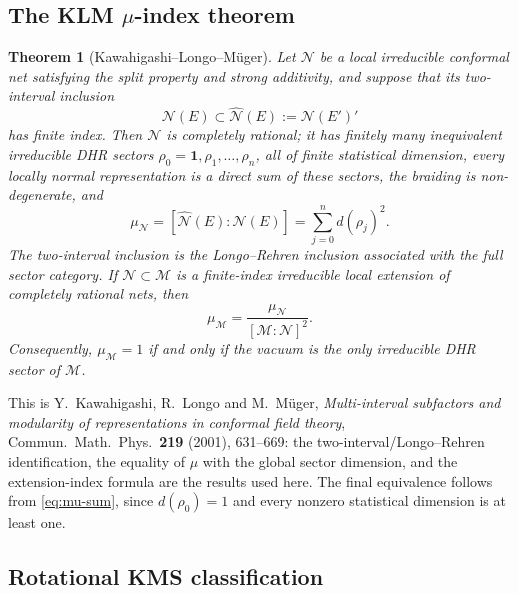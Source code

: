\documentclass[11pt]{article}
\newtheorem{theorem}{Theorem}[section]
\theoremstyle{remark}
\newcommand{\id}{\mathbf 1}
\begin{document}
\subsection{\texorpdfstring{The KLM $\mu$-index theorem}{The KLM mu-index theorem}}

\begin{theorem}[Kawahigashi--Longo--M\"uger]
\label{thm:klm}
Let $\mathcal N$ be a local irreducible conformal net satisfying the
split property and strong additivity, and suppose that its
two-interval inclusion
\[
 \mathcal N(E)\subset\widehat{\mathcal N}(E)
 :=\mathcal N(E')'
\]
has finite index.  Then $\mathcal N$ is completely rational; it has
finitely many inequivalent irreducible DHR sectors
$\rho_0=\id,\rho_1,\ldots,\rho_n$, all of finite statistical
dimension, every locally normal representation is a direct sum of
these sectors, the braiding is non-degenerate, and
\[
 \mu_{\mathcal N}
 =[\widehat{\mathcal N}(E):\mathcal N(E)]
 =\sum_{j=0}^{n}d(\rho_j)^2.
\tag{2.7}\label{eq:mu-sum}
\]
The two-interval inclusion is the Longo--Rehren inclusion associated
with the full sector category.  If
$\mathcal N\subset\mathcal M$ is a finite-index irreducible local
extension of completely rational nets, then
\[
 \mu_{\mathcal M}
 =\frac{\mu_{\mathcal N}}{[\mathcal M:\mathcal N]^2}.
\tag{2.8}\label{eq:mu-extension}
\]
Consequently, $\mu_{\mathcal M}=1$ if and only if the vacuum is the
only irreducible DHR sector of $\mathcal M$.
\end{theorem}

This is Y.~Kawahigashi, R.~Longo and M.~M\"uger,
\emph{Multi-interval subfactors and modularity of representations in
conformal field theory}, Commun.\ Math.\ Phys.\ \textbf{219} (2001),
631--669: the two-interval/Longo--Rehren identification, the equality
of $\mu$ with the global sector dimension, and the extension-index
formula are the results used here.  The final equivalence follows
from \eqref{eq:mu-sum}, since $d(\rho_0)=1$ and every nonzero
statistical dimension is at least one.

\subsection{Rotational KMS classification}
\end{document}
